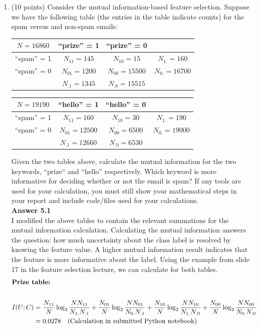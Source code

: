\documentclass[twoside,10pt]{article}
\begin{document}
\begin{enumerate}

\item (10 points) Consider the mutual information-based feature selection. Suppose we have the following table (the entries in the table indicate counts) for the spam versus and non-spam emails:
%
\begin{center}
\begin{tabular}{c|c|c|c}
\hline
$N=16860$ & ``prize'' = 1 & ``prize'' = 0 &\\\hline
``spam'' = 1 & $N_{11} = 145$& $N_{10} = 15$ & $N_{1.} = 160$\\ \hline 
 ``spam'' = 0 & $N_{01} = 1200$ & $N_{00} = 15500$ & $N_{0.} = 16700$\\\hline
 & $N_{.1} = 1345$ & $N_{.0} = 15515$ & \\ \hline
\end{tabular}
\end{center}

\begin{center}
\begin{tabular}{c|c|c|c}
\hline
$N=19190$ & ``hello'' = 1 & ``hello'' = 0 &\\\hline
``spam'' = 1 & $N_{11} = 160$ & $N_{10} = 30$ & $N_{1.} = 190$\\ \hline 
 ``spam'' = 0 & $N_{01} = 12500$ & $N_{00} = 6500$  & $N_{0.} = 19000$\\\hline
 & $N_{.1} = 12660$ & $N_{.0} = 6530$ & \\ \hline
\end{tabular}
\end{center}

Given the two tables above, calculate the mutual information for the two keywords, ``prize`` and ``hello'' respectively. Which keyword is more informative for deciding whether or not the email is spam? If any tools are used for your calculation, you must still show your mathematical steps in your report and include code/files used for your calculations.
\\{\bf Answer 5.1} \\
I modified the above tables to contain the relevant summations for the mutual information calculation. Calculating the mutual information answers the question: how much uncertainty about the class label is resolved by knowing the feature value. A higher mutual information result indicates that the feature is more informative about the label. Using the example from slide 17 in the feature selection lecture, we can calculate for both tables.
\begin{align*}
\intertext{\bf Prize table:} \\
I(U;C) &= \frac{N_{11}}{N} \log_2 \frac{N N_{11}}{N_{1.} N_{.1}} + 
    \frac{N_{01}}{N} \log_2 \frac{N N_{01}}{N_{0.} N_{.1}} +
    \frac{N_{10}}{N} \log_2 \frac{N N_{10}}{N_{1.} N_{.0}} +
    \frac{N_{00}}{N} \log_2 \frac{N N_{00}}{N_{0.} N_{.0}} \\
 &= 0.0278 \quad \text{(Calculation in submitted Python notebook)}
\end{align*}


\end{enumerate}
\end{document}
